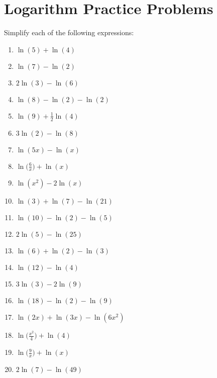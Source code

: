 \documentclass{article}
\begin{document}
\section*{Logarithm Practice Problems}

Simplify each of the following expressions:

\begin{enumerate}
  \item $\ln(5) + \ln(4)$
  \item $\ln(7) - \ln(2)$
  \item $2\ln(3) - \ln(6)$
  \item $\ln(8) - \ln(2) - \ln(2)$
  \item $\ln(9) + \tfrac12\ln(4)$
  \item $3\ln(2) - \ln(8)$
  \item $\ln(5x) - \ln(x)$
  \item $\ln\!\bigl(\tfrac{6}{x}\bigr) + \ln(x)$
  \item $\ln(x^2) - 2\ln(x)$
  \item $\ln(3) + \ln(7) - \ln(21)$
  \item $\ln(10) - \ln(2) - \ln(5)$
  \item $2\ln(5) - \ln(25)$
  \item $\ln(6) + \ln(2) - \ln(3)$
  \item $\ln(12) - \ln(4)$
  \item $3\ln(3) - 2\ln(9)$
  \item $\ln(18) - \ln(2) - \ln(9)$
  \item $\ln(2x) + \ln(3x) - \ln(6x^2)$
  \item $\ln\!\bigl(\tfrac{x^2}{4}\bigr) + \ln(4)$
  \item $\ln\!\bigl(\tfrac{9}{x}\bigr) + \ln(x)$
  \item $2\ln(7) - \ln(49)$
\end{enumerate}
\end{document}
